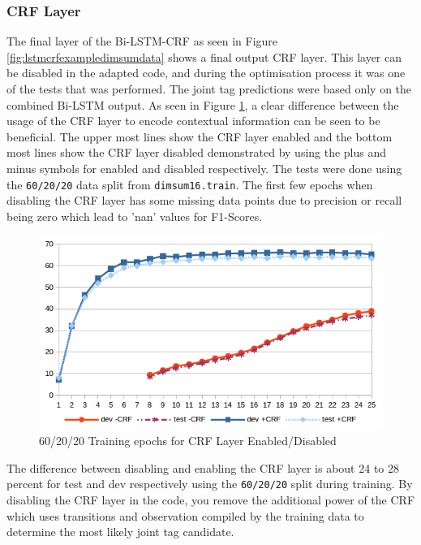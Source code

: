 \subsubsection{CRF Layer}

The final layer of the Bi-LSTM-CRF as seen in Figure \ref{fig:lstmcrfexampledimsumdata} shows a final output CRF layer. This layer can be disabled in the adapted code, and during the optimisation process it was one of the tests that was performed. The joint tag predictions were based only on the combined Bi-LSTM output. As seen in Figure \ref{fig:602020crflayerenabledisablelinegraph}, a clear difference between the usage of the CRF layer to encode contextual information can be seen to be beneficial. The upper most lines show the CRF layer enabled and the bottom most lines show the CRF layer disabled demonstrated by using the plus and minus symbols for enabled and disabled respectively. The tests were done using the \texttt{60/20/20} data split from \texttt{dimsum16.train}. The first few epochs when disabling the CRF layer has some missing data points due to precision or recall being zero which lead to 'nan' values for F1-Scores.

\begin{figure}[H]
  \includegraphics[width=\textwidth]{images/bi_lstm_crf_60_20_20_crf_comparison_training_line_graph.png}
  \caption{60/20/20 Training epochs for CRF Layer Enabled/Disabled}
  \label{fig:602020crflayerenabledisablelinegraph}
\end{figure}

The difference between disabling and enabling the CRF layer is about 24 to 28 percent for test and dev respectively using the \texttt{60/20/20} split during training. By disabling the CRF layer in the code, you remove the additional power of the CRF which uses transitions and observation compiled by the training data to determine the most likely joint tag candidate. 


